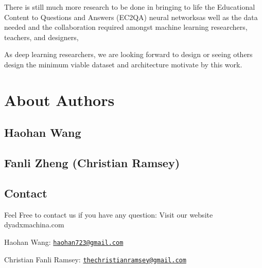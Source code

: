 \documentclass[]{book}
\theoremstyle{definition}
\theoremstyle{definition}
\theoremstyle{definition}
\theoremstyle{remark}
\begin{document}
There is still much more research to be done in bringing to life the
Educational Content to Questions and Answers (EC2QA) neural networksas
well as the data needed and the collaboration required amongst machine
learning researchers, teachers, and designers,

As deep learning researchers, we are looking forward to design or seeing
others design the minimum viable dataset and architecture motivate by
this work.

\chapter{About Authors}\label{about-authors}

\section{Haohan Wang}\label{haohan-wang}

\section{Fanli Zheng (Christian
Ramsey)}\label{fanli-zheng-christian-ramsey}

\section{Contact}\label{contact}

Feel Free to contact us if you have any question: Visit our website
dyadxmachina.com

Haohan Wang:
\href{mailto:haohan723@gmail.com}{\nolinkurl{haohan723@gmail.com}}

Christian Fanli Ramsey:
\href{mailto:thechristianramsey@gmail.com}{\nolinkurl{thechristianramsey@gmail.com}}


\end{document}
